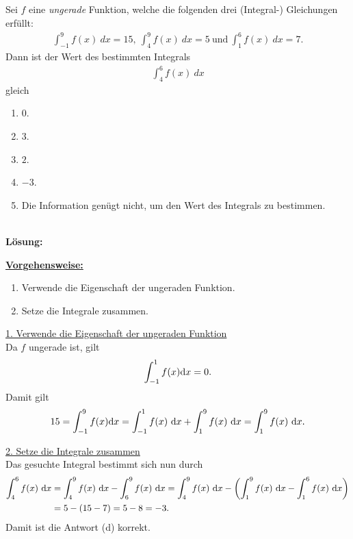 \subsection*{}
Sei $ f $ eine \textit{ungerade} Funktion, welche die folgenden drei (Integral-) Gleichungen erfüllt:
\begin{align*}
	\int_{-1}^9 f(x) \ dx = 15, \
	\int_4^9 f(x) \ dx = 5 \ \textrm{und} \
	\int_1^6 f(x) \ dx = 7.
\end{align*}
Dann ist der Wert des bestimmten Integrals
\begin{align*}
	\int_4^6 f(x) \ dx
\end{align*}  
gleich
\renewcommand{\labelenumi}{(\alph{enumi})}
\begin{enumerate}
	\item 
	$ 0 $.
	\item
	$ 3 $.
	\item
	$ 2 $.
	\item
	$ -3 $.
	\item
	Die Information genügt nicht, um den Wert des Integrals zu bestimmen.
\end{enumerate}\ \\
\textbf{Lösung:}
\begin{mdframed}
\underline{\textbf{Vorgehensweise:}}
\renewcommand{\labelenumi}{\theenumi.}
\begin{enumerate}
\item Verwende die Eigenschaft der ungeraden Funktion.
\item Setze die Integrale zusammen.
\end{enumerate}
\end{mdframed}

\underline{1. Verwende die Eigenschaft der ungeraden Funktion}\\
Da $ f $ ungerade ist, gilt
\begin{align*}
	\int_{-1}^1 f(x) \text{\rmfamily d} x
	= 
	0.
\end{align*} 
Damit gilt 
\begin{align*}
	15 = \int_{-1}^9 f(x) \text{\rmfamily d} x
	= 
	\int_{-1}^1 f(x) \ \text{\rmfamily d} x + \int_{1}^9 f(x) \ \text{\rmfamily d} x
	=
	\int_{1}^9 f(x) \ \text{\rmfamily d} x.
\end{align*}

\underline{2. Setze die Integrale zusammen}\\
Das gesuchte Integral bestimmt sich nun durch
\begin{align*}
	\int_4^6 f(x) \ \text{\rmfamily d} x
	&=
	\int_4^9 f(x) \ \text{\rmfamily d} x
	-
	\int_6^9 f(x) \ \text{\rmfamily d} x
	=
	\int_4^9 f(x) \ \text{\rmfamily d} x
	-
	\left(
	\int_1^9 f(x) \ \text{\rmfamily d} x
	-
	\int_1^6 f(x) \ \text{\rmfamily d} x
	\right)\\
	&=
	5-(15-7)
	=
	5 - 8 = -3.
\end{align*}
Damit ist die Antwort (d) korrekt.
\newpage
